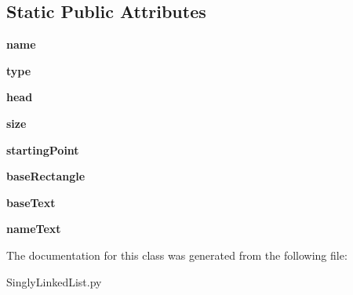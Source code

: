 \subsection*{Static Public Attributes}
\begin{DoxyCompactItemize}
\item 
{\bfseries name}\hypertarget{class_singly_linked_list_1_1_singly_linked_list_a290bf002e85d460ea4d1b12eac95dccd}{}\label{class_singly_linked_list_1_1_singly_linked_list_a290bf002e85d460ea4d1b12eac95dccd}

\item 
{\bfseries type}\hypertarget{class_singly_linked_list_1_1_singly_linked_list_a523062fb5f8c37c3c55a3ac7bcb385cf}{}\label{class_singly_linked_list_1_1_singly_linked_list_a523062fb5f8c37c3c55a3ac7bcb385cf}

\item 
{\bfseries head}\hypertarget{class_singly_linked_list_1_1_singly_linked_list_ae70237744ebaa52ad5d0fd4ad0553737}{}\label{class_singly_linked_list_1_1_singly_linked_list_ae70237744ebaa52ad5d0fd4ad0553737}

\item 
{\bfseries size}\hypertarget{class_singly_linked_list_1_1_singly_linked_list_adef9daaead920d38b19c7f5a9e6f025f}{}\label{class_singly_linked_list_1_1_singly_linked_list_adef9daaead920d38b19c7f5a9e6f025f}

\item 
{\bfseries starting\+Point}\hypertarget{class_singly_linked_list_1_1_singly_linked_list_a9b5e91c46108457bc497b06e781a0972}{}\label{class_singly_linked_list_1_1_singly_linked_list_a9b5e91c46108457bc497b06e781a0972}

\item 
{\bfseries base\+Rectangle}\hypertarget{class_singly_linked_list_1_1_singly_linked_list_a54b5b1f0bcb057e1b0e4380b27e4d882}{}\label{class_singly_linked_list_1_1_singly_linked_list_a54b5b1f0bcb057e1b0e4380b27e4d882}

\item 
{\bfseries base\+Text}\hypertarget{class_singly_linked_list_1_1_singly_linked_list_ab5991739cc77c0d955ec7abd3f885f16}{}\label{class_singly_linked_list_1_1_singly_linked_list_ab5991739cc77c0d955ec7abd3f885f16}

\item 
{\bfseries name\+Text}\hypertarget{class_singly_linked_list_1_1_singly_linked_list_a63451171839ddf5dea0beba8c3376b6c}{}\label{class_singly_linked_list_1_1_singly_linked_list_a63451171839ddf5dea0beba8c3376b6c}

\end{DoxyCompactItemize}


The documentation for this class was generated from the following file\+:\begin{DoxyCompactItemize}
\item 
Singly\+Linked\+List.\+py\end{DoxyCompactItemize}
